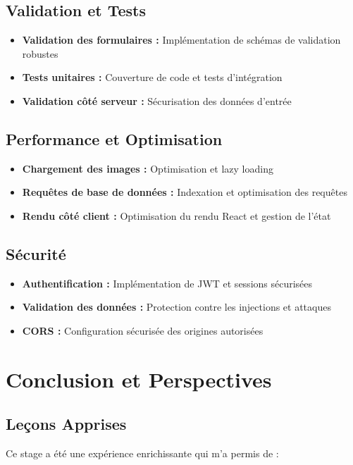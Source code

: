 \documentclass[12pt,a4paper]{article}
\begin{document}
\subsection{Validation et Tests}
\begin{itemize}
    \item \textbf{Validation des formulaires :} Implémentation de schémas de validation robustes
    \item \textbf{Tests unitaires :} Couverture de code et tests d'intégration
    \item \textbf{Validation côté serveur :} Sécurisation des données d'entrée
\end{itemize}

\subsection{Performance et Optimisation}
\begin{itemize}
    \item \textbf{Chargement des images :} Optimisation et lazy loading
    \item \textbf{Requêtes de base de données :} Indexation et optimisation des requêtes
    \item \textbf{Rendu côté client :} Optimisation du rendu React et gestion de l'état
\end{itemize}

\subsection{Sécurité}
\begin{itemize}
    \item \textbf{Authentification :} Implémentation de JWT et sessions sécurisées
    \item \textbf{Validation des données :} Protection contre les injections et attaques
    \item \textbf{CORS :} Configuration sécurisée des origines autorisées
\end{itemize}

\section{Conclusion et Perspectives}

\subsection{Leçons Apprises}
Ce stage a été une expérience enrichissante qui m'a permis de :
\end{document}
